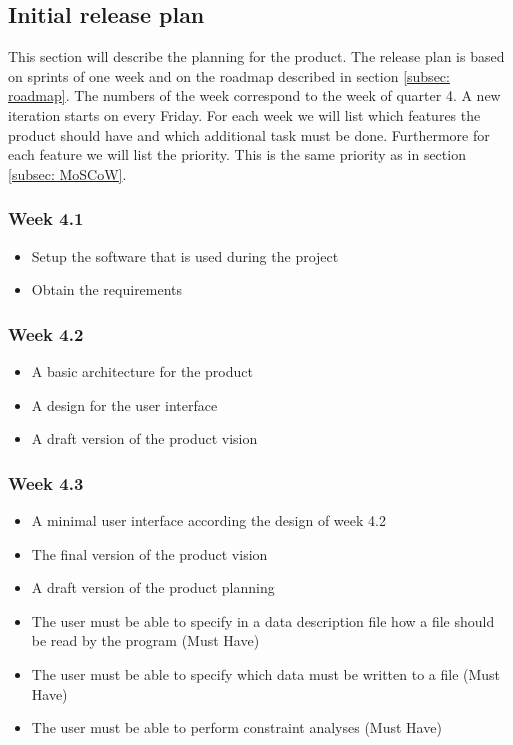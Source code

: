 \subsection{Initial release plan}
\label{subsec: release-plan}
This section will describe the planning for the product. The release plan is based on sprints of one week and on the roadmap described in section \ref{subsec: roadmap}. The numbers of the week correspond to the week of quarter 4. A new iteration starts on every Friday. For each week we will list which features the product should have and which additional task must be done. Furthermore for each feature we will list the priority. This is the same priority as in section \ref{subsec: MoSCoW}.
\subsubsection{Week 4.1}
\begin{itemize}
	\item Setup the software that is used during the project
	\item Obtain the requirements
\end{itemize}

\subsubsection{Week 4.2}
\begin{itemize}
\item A basic architecture for the product
\item A design for the user interface
\item A draft version of the product vision
\end{itemize}
\subsubsection{Week 4.3}
\begin{itemize}
	\item A minimal user interface according the design of week 4.2
	\item The final version of the product vision
	\item A draft version of the product planning
	\item The user must be able to specify in a data description file how a file should be read by the program (Must Have)
	\item The user must be able to specify which data must be written to a file (Must Have)
	\item The user must be able to perform constraint analyses (Must Have)
\end{itemize}
